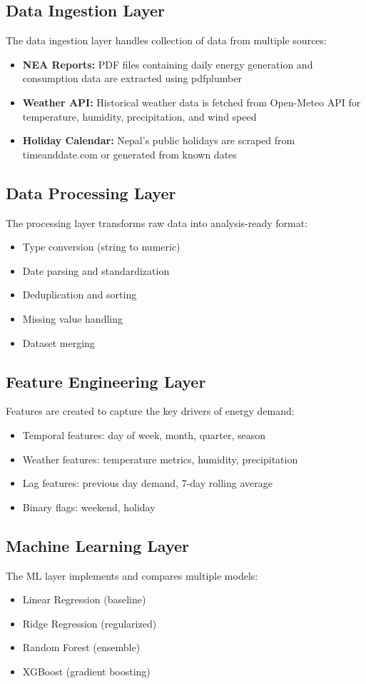 	\subsection{Data Ingestion Layer}
	The data ingestion layer handles collection of data from multiple sources:
	\begin{itemize}
		\item \textbf{NEA Reports:} PDF files containing daily energy generation and consumption data are extracted using pdfplumber
		\item \textbf{Weather API:} Historical weather data is fetched from Open-Meteo API for temperature, humidity, precipitation, and wind speed
		\item \textbf{Holiday Calendar:} Nepal's public holidays are scraped from timeanddate.com or generated from known dates
	\end{itemize}

	\subsection{Data Processing Layer}
	The processing layer transforms raw data into analysis-ready format:
	\begin{itemize}
		\item Type conversion (string to numeric)
		\item Date parsing and standardization
		\item Deduplication and sorting
		\item Missing value handling
		\item Dataset merging
	\end{itemize}

	\subsection{Feature Engineering Layer}
	Features are created to capture the key drivers of energy demand:
	\begin{itemize}
		\item Temporal features: day of week, month, quarter, season
		\item Weather features: temperature metrics, humidity, precipitation
		\item Lag features: previous day demand, 7-day rolling average
		\item Binary flags: weekend, holiday
	\end{itemize}

	\subsection{Machine Learning Layer}
	The ML layer implements and compares multiple models:
	\begin{itemize}
		\item Linear Regression (baseline)
		\item Ridge Regression (regularized)
		\item Random Forest (ensemble)
		\item XGBoost (gradient boosting)
	\end{itemize}


